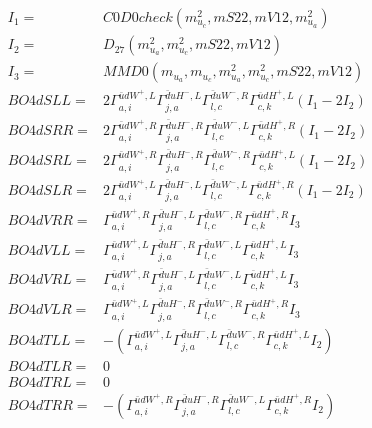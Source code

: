 \documentclass[A4,landscape]{article}
\begin{document}
\begin{align} 
I_1 = & C0D0check(m^2_{u_{{c}}}, mS22, mV12, m^2_{u_{{a}}}) \\ 
I_2 = & D_{27}(m^2_{u_{{a}}}, m^2_{u_{{c}}}, mS22, mV12) \\ 
I_3 = & MMD0(m_{u_{{a}}}, m_{u_{{c}}}, m^2_{u_{{a}}}, m^2_{u_{{c}}}, mS22, mV12) \\ 
  BO4dSLL= & 2  \Gamma^{\bar{u}d W^+ ,L}_{a, i} \Gamma^{\bar{d}u H^-,L}_{j, a} \Gamma^{\bar{d}u W^-,R}_{l, c} \Gamma^{\bar{u}d H^+ ,L}_{c, k} (I_1 - 2 I_2) \\ 
  BO4dSRR= & 2  \Gamma^{\bar{u}d W^+ ,R}_{a, i} \Gamma^{\bar{d}u H^-,R}_{j, a} \Gamma^{\bar{d}u W^-,L}_{l, c} \Gamma^{\bar{u}d H^+ ,R}_{c, k} (I_1 - 2 I_2) \\ 
  BO4dSRL= & 2  \Gamma^{\bar{u}d W^+ ,R}_{a, i} \Gamma^{\bar{d}u H^-,R}_{j, a} \Gamma^{\bar{d}u W^-,R}_{l, c} \Gamma^{\bar{u}d H^+ ,L}_{c, k} (I_1 - 2 I_2) \\ 
  BO4dSLR= & 2  \Gamma^{\bar{u}d W^+ ,L}_{a, i} \Gamma^{\bar{d}u H^-,L}_{j, a} \Gamma^{\bar{d}u W^-,L}_{l, c} \Gamma^{\bar{u}d H^+ ,R}_{c, k} (I_1 - 2 I_2) \\ 
  BO4dVRR= &  \Gamma^{\bar{u}d W^+ ,R}_{a, i} \Gamma^{\bar{d}u H^-,L}_{j, a} \Gamma^{\bar{d}u W^-,R}_{l, c} \Gamma^{\bar{u}d H^+ ,R}_{c, k} I_3 \\ 
  BO4dVLL= &  \Gamma^{\bar{u}d W^+ ,L}_{a, i} \Gamma^{\bar{d}u H^-,R}_{j, a} \Gamma^{\bar{d}u W^-,L}_{l, c} \Gamma^{\bar{u}d H^+ ,L}_{c, k} I_3 \\ 
  BO4dVRL= &  \Gamma^{\bar{u}d W^+ ,R}_{a, i} \Gamma^{\bar{d}u H^-,L}_{j, a} \Gamma^{\bar{d}u W^-,L}_{l, c} \Gamma^{\bar{u}d H^+ ,L}_{c, k} I_3 \\ 
  BO4dVLR= &  \Gamma^{\bar{u}d W^+ ,L}_{a, i} \Gamma^{\bar{d}u H^-,R}_{j, a} \Gamma^{\bar{d}u W^-,R}_{l, c} \Gamma^{\bar{u}d H^+ ,R}_{c, k} I_3 \\ 
  BO4dTLL= & -( \Gamma^{\bar{u}d W^+ ,L}_{a, i} \Gamma^{\bar{d}u H^-,L}_{j, a} \Gamma^{\bar{d}u W^-,R}_{l, c} \Gamma^{\bar{u}d H^+ ,L}_{c, k} I_2) \\ 
  BO4dTLR= & 0 \\ 
  BO4dTRL= & 0 \\ 
  BO4dTRR= & -( \Gamma^{\bar{u}d W^+ ,R}_{a, i} \Gamma^{\bar{d}u H^-,R}_{j, a} \Gamma^{\bar{d}u W^-,L}_{l, c} \Gamma^{\bar{u}d H^+ ,R}_{c, k} I_2) \\ 
\end{align} 
\end{document}
